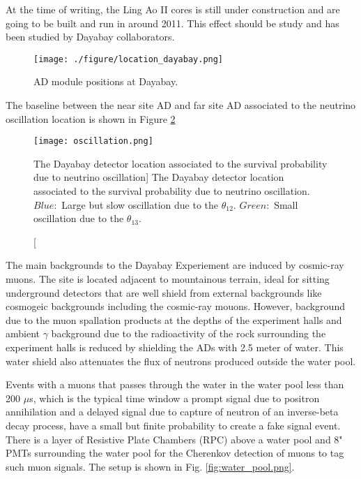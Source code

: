 At the time of writing, the Ling Ao II cores is still under construction and are going to be built and run in around
2011. This effect should be study and has been studied by Dayabay collaborators.


\begin{figure}
    \centering
    \texttt{[image: ./figure/location\_dayabay.png]}
    \caption{AD module positions at Dayabay.}
    \label{fig:location_dayabay.png}
    \end{figure}


The baseline between the near site AD and far site AD associated to the neutrino oscillation
location is shown in Figure \ref{fig:oscillation}


\begin{figure}
    \centering
    \texttt{[image: oscillation.png]}
    \caption
    [The Dayabay detector location associated to the survival probability due to neutrino oscillation]
    {The Dayabay detector location associated to the survival probability due to neutrino oscillation.
$Blue:$ Large but slow oscillation due to the $\theta_{12}$. $Green:$ Small oscillation due to the $\theta_{13}$.}
    \label{fig:oscillation}
    \end{figure}




The main backgrounds to the Dayabay Experiement are induced by cosmic-ray muons.
The site is located adjacent to mountainous terrain, ideal for sitting underground detectors that
are well shield from external backgrounds like cosmogeic backgrounds including the cosmic-ray mouons.
However, background due to the muon spallation products at the depths of the experiment halls and ambient
$\gamma$ background due to the radioactivity of the rock surrounding the experiment halls is reduced by shielding
the ADs with 2.5 meter of water. This water shield also attenuates the flux of neutrons produced outside the water
pool.

Events with a muons that passes through the water in the water pool less than 200 $\mu$s, which is the typical time window
a prompt signal due to positron annihilation and a delayed signal due to capture of neutron of an inverse-beta decay process, have a small but finite
probability to create a fake signal event.
There is a layer of  Resistive Plate Chambers (RPC) above a water pool
and 8" PMTs surrounding the water pool for the Cherenkov detection of muons to tag such muon signals.
The setup is shown in Fig. \ref{fig:water_pool.png}.


